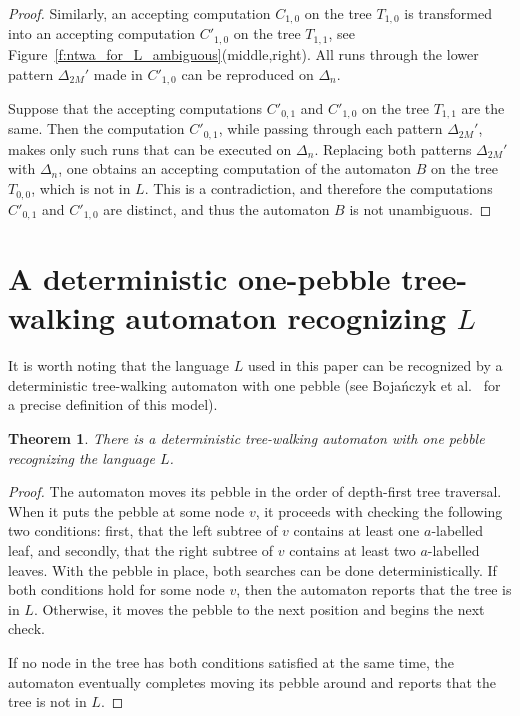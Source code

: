 \documentclass[12pt,a4paper]{article}
\newtheorem{theorem}{Theorem}
\theoremstyle{definition}
\begin{document}
\begin{proof}
Similarly, an accepting computation $C_{1,0}$ on the tree $T_{1,0}$
is transformed into an accepting computation $C'_{1,0}$ on the tree $T_{1,1}$,
see Figure~\ref{f:ntwa_for_L_ambiguous}(middle,right).
All runs through the lower pattern $\Delta_{2M}'$ made in $C'_{1,0}$
can be reproduced on $\Delta_n$.

Suppose that the accepting computations $C'_{0,1}$ and $C'_{1,0}$ on the tree $T_{1,1}$ are the same.
Then the computation $C'_{0,1}$, while passing through each pattern $\Delta_{2M}'$,
makes only such runs that can be executed on $\Delta_n$.
Replacing both patterns $\Delta_{2M}'$ with $\Delta_n$,
one obtains an accepting computation of the automaton $B$
on the tree $T_{0,0}$, which is not in $L$.
This is a contradiction, and therefore
the computations $C'_{0,1}$ and $C'_{1,0}$ are distinct,
and thus the automaton $B$ is not unambiguous.
\end{proof}





\section{A deterministic one-pebble tree-walking automaton recognizing $L$}

It is worth noting that the language $L$ used in this paper
can be recognized by a deterministic tree-walking automaton with one pebble
(see Boja\'nczyk et al.~\cite{BojanczykSamuelidesSchwentickSegoufin}
for a precise definition of this model).

\begin{theorem}
There is a deterministic tree-walking automaton with one pebble
recognizing the language $L$.
\end{theorem}
\begin{proof}
The automaton moves its pebble in the order of depth-first tree traversal.
When it puts the pebble at some node $v$,
it proceeds with checking the following two conditions:
first, that the left subtree of $v$ contains at least one $a$-labelled leaf,
and secondly, that the right subtree of $v$ contains at least two $a$-labelled leaves.
With the pebble in place,
both searches can be done deterministically.
If both conditions hold for some node $v$,
then the automaton reports that the tree is in $L$.
Otherwise, it moves the pebble to the next position
and begins the next check.

If no node in the tree has both conditions satisfied at the same time,
the automaton eventually completes moving its pebble around
and reports that the tree is not in $L$.
\end{proof}
\end{document}
